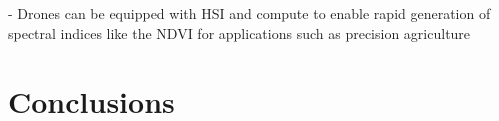 \documentclass[remotesensing,article,submit,pdftex,moreauthors]{Definitions/mdpi}
\begin{document}
- Drones can be equipped with HSI and compute to enable rapid generation of spectral indices like the NDVI for applications such as precision agriculture \cite{horstrand2019uav}

\section{Conclusions}


\vspace{6pt} 






\end{document}
